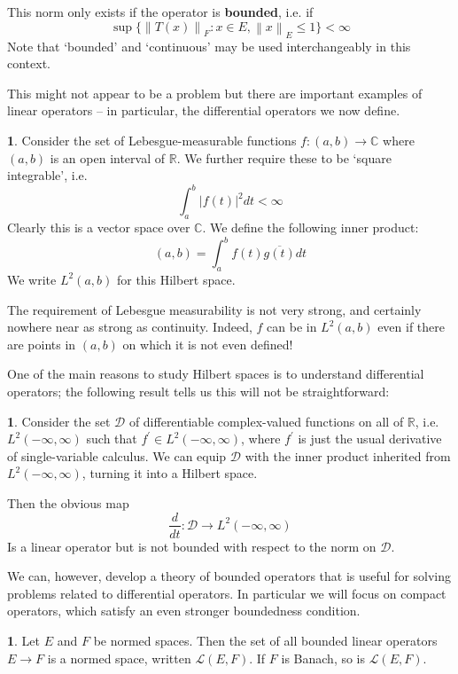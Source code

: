 \documentclass[oneside,english]{amsbook}
\numberwithin{section}{chapter}
\theoremstyle{plain}
\theoremstyle{definition}
\newtheorem{defn}[thm]{\protect\definitionname}
\newcommand{\norm}[1]{\left\lVert#1\right\rVert}
\providecommand{\definitionname}{Definition}
\begin{document}
This norm only exists if the operator is \textbf{bounded}, i.e. if
\[
	\sup\{\norm{T(x)}_F : x\in E, \norm{x}_E\le 1\} < \infty
\]
Note that `bounded' and `continuous' may be used interchangeably in this context.

This might not appear to be a problem but there are important examples of linear operators -- in particular, the differential operators we now define.

\begin{defn}
	Consider the set of Lebesgue-measurable functions $f:(a, b)\to \mathbb{C}$ where $(a, b)$ is an open interval of $\mathbb{R}$. We further require these to be `square integrable', i.e.
	\[
		\int_a^b |f(t)|^2 dt < \infty
	\]
	Clearly this is a vector space over $\mathbb{C}$. We define the following inner product:
	\[
		(a, b) = \int_a^b f(t)\overline{g(t)} dt
	\]
	We write $L^2(a, b)$ for this Hilbert space.
\end{defn}

The requirement of Lebesgue measurability is not very strong, and certainly nowhere near as strong as continuity. Indeed, $f$ can be in $L^2(a, b)$ even if there are points in $(a, b)$ on which it is not even defined!

One of the main reasons to study Hilbert spaces is to understand differential operators; the following result tells us this will not be straightforward: 

\begin{defn}
	Consider the set $\mathscr{D}$ of differentiable complex-valued functions on all of $\mathbb{R}$, i.e. $L^2(-\infty, \infty)$ such that $f^\prime\in L^2(-\infty, \infty)$, where $f^\prime$ is just the usual derivative of single-variable calculus. We can equip $\mathscr{D}$ with the inner product inherited from  $L^2(-\infty, \infty)$, turning it into a Hilbert space.
	
	Then the obvious map \[
		\frac{d}{dt}: \mathscr{D}\to L^2(-\infty, \infty)
	\]
	Is a linear operator but is not bounded with respect to the norm on $\mathscr{D}$.
\end{defn}

We can, however, develop a theory of bounded operators that is useful for solving problems related to differential operators. In particular we will focus on compact operators, which satisfy an even stronger boundedness condition.

\begin{defn}
	Let $E$ and $F$ be normed spaces. Then the set of all bounded linear operators $E\to F$ is a normed space, written $\mathscr{L}(E, F)$. If $F$ is Banach, so is $\mathscr{L}(E, F)$.
\end{defn}
\end{document}

